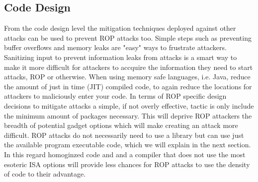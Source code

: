 \documentclass[11pt]{amsart}
\begin{document}
\subsection*{Code Design}
From the code design level the mitigation techniques deployed against other attacks can be used to prevent ROP attacks too. Simple steps such as preventing buffer overflows and memory leaks are "easy" ways to frustrate attackers. Sanitizing input to prevent information leaks from attacks is a smart way to make it more difficult for attackers to accquire the information they need to start attacks, ROP or otherwise. When using memory safe languages, i.e. Java, reduce the amount of just in time (JIT) compiled code, to again reduce the locations for attackers to maliciously enter your code.\newline
In terms of ROP specific design decisions to mitigate attacks a simple, if not overly effective, tactic is only include the minimum amount of packages necessary. This will deprive ROP attackers the breadth of potential gadget options which will make creating an attack more difficult. ROP attacks do not necessarily need to use a library but can use just the available program executable code, which we will explain in the next section. In this regard homoginzed code and and a compiler that does not use the most esoteric ISA options will provide less chances for ROP attacks to use the density of code to their advantage.
\end{document}
